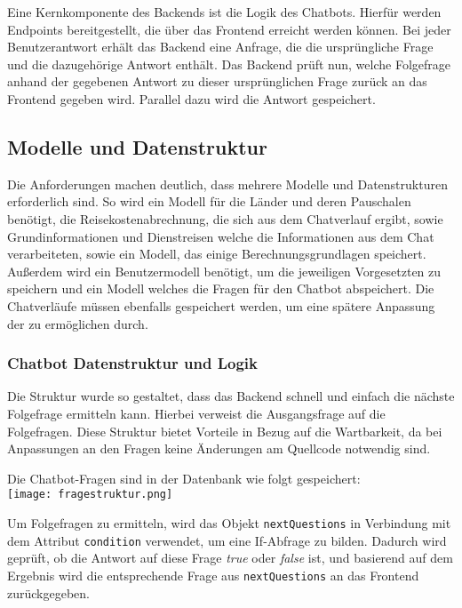 Eine Kernkomponente des Backends ist die Logik des Chatbots. Hierfür werden Endpoints bereitgestellt, die über das Frontend erreicht werden können. Bei jeder Benutzerantwort erhält das Backend eine Anfrage, die die ursprüngliche Frage und die dazugehörige Antwort enthält. Das Backend prüft nun, welche Folgefrage anhand der gegebenen Antwort zu dieser ursprünglichen Frage zurück an das Frontend gegeben wird. Parallel dazu wird die Antwort gespeichert.

\subsection{Modelle und Datenstruktur}
\label{sec:Planungsphase:ModelleDatenstruktur}

Die Anforderungen machen deutlich, dass mehrere Modelle und Datenstrukturen erforderlich sind. So wird ein Modell für die Länder und deren Pauschalen benötigt, die Reisekostenabrechnung, die sich aus dem Chatverlauf ergibt, sowie Grundinformationen und Dienstreisen welche die Informationen aus dem Chat verarbeiteten, sowie ein Modell, das einige Berechnungsgrundlagen speichert. Außerdem wird ein Benutzermodell benötigt, um die jeweiligen Vorgesetzten zu speichern und ein Modell welches die Fragen für den Chatbot abspeichert.
Die Chatverläufe müssen ebenfalls gespeichert werden, um eine spätere Anpassung der  zu ermöglichen durch.

\subsubsection{Chatbot Datenstruktur und Logik}
\label{sec:ModelleDatenstruktur:ChatbotDatenstrukturLogik}

Die Struktur wurde so gestaltet, dass das Backend schnell und einfach die nächste Folgefrage ermitteln kann. Hierbei verweist die Ausgangsfrage auf die Folgefragen.
Diese Struktur bietet Vorteile in Bezug auf die Wartbarkeit, da bei Anpassungen an den Fragen keine Änderungen am Quellcode notwendig sind.

Die Chatbot-Fragen sind in der Datenbank wie folgt gespeichert:\\
\texttt{[image: fragestruktur.png]}

Um Folgefragen zu ermitteln, wird das Objekt \verb|nextQuestions| in Verbindung mit dem Attribut \verb|condition| verwendet, um eine If-Abfrage zu bilden. Dadurch wird geprüft, ob die Antwort auf diese Frage \textit{true} oder \textit{false} ist, und basierend auf dem Ergebnis wird die entsprechende Frage aus \verb|nextQuestions| an das Frontend zurückgegeben.

